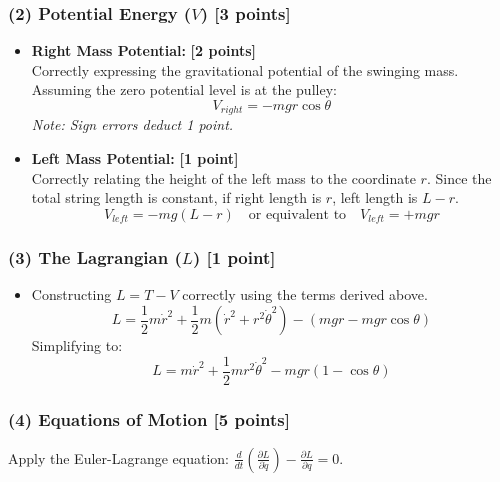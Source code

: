 \documentclass[11pt, a4paper]{article} %
\begin{document}
\subsubsection*{(2) Potential Energy ($V$) [3 points]}
\begin{itemize}
    \item \textbf{Right Mass Potential:} \hfill \textbf{[2 points]} \\
    Correctly expressing the gravitational potential of the swinging mass. Assuming the zero potential level is at the pulley:
    $$ V_{right} = -mgr \cos\theta $$
    \textit{Note: Sign errors deduct 1 point.}
    \item \textbf{Left Mass Potential:} \hfill \textbf{[1 point]} \\
    Correctly relating the height of the left mass to the coordinate $r$. Since the total string length is constant, if right length is $r$, left length is $L-r$.
    $$ V_{left} = -mg(L-r) \quad \text{or equivalent to} \quad V_{left} = +mgr $$
\end{itemize}

\subsubsection*{(3) The Lagrangian ($L$) [1 point]}
\begin{itemize}
    \item Constructing $L = T - V$ correctly using the terms derived above.
    $$ L = \frac{1}{2}m\dot{r}^2 + \frac{1}{2}m(\dot{r}^2 + r^2\dot{\theta}^2) - (mgr - mgr\cos\theta) $$
    Simplifying to:
    $$ L = m\dot{r}^2 + \frac{1}{2}mr^2\dot{\theta}^2 - mgr(1 - \cos\theta) $$
\end{itemize}

\subsubsection*{(4) Equations of Motion [5 points]}
Apply the Euler-Lagrange equation: $\frac{d}{dt}\left(\frac{\partial L}{\partial \dot{q}}\right) - \frac{\partial L}{\partial q} = 0$.
\end{document}
